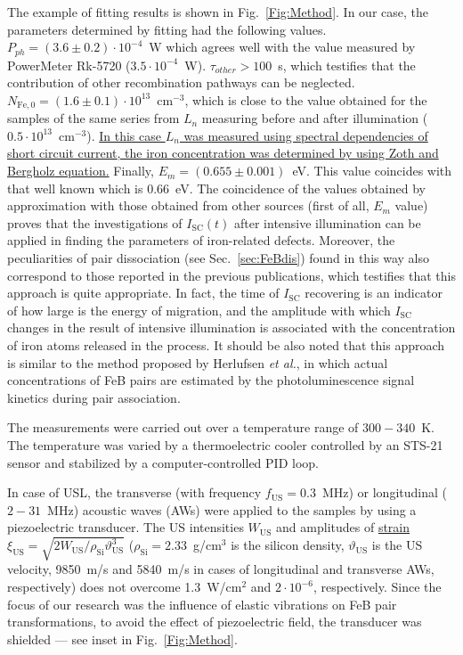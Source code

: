 \documentclass[%
 aip,jap,
 amsmath,amssymb,
 reprint,%
]{revtex4-1}
\begin{document}
The example of fitting results is shown in Fig.~\ref{Fig:Method}.
In our case, the parameters determined by fitting had the following values.
$P_{ph} = (3.6\pm0.2)\cdot10^{-4}$~W which agrees well
with the value measured by PowerMeter Rk-5720 ($3.5\cdot10^{-4}$~W).
$\tau_{other}>100$~s, which testifies that the contribution of other recombination pathways can be neglected.
$N_\mathrm{Fe,0}=(1.6\pm0.1)\cdot10^{13}$~cm$^{-3}$,
which is close to the value obtained for the samples of the same series from $L_n$ measuring before and after illumination ($0.5\cdot10^{13}$~cm$^{-3}$).
\textcolor[rgb]{0.00,0.07,1.00}{\uline{
In this case $L_{n}$ was measured using spectral dependencies of short circuit current\cite{LnIscMethod},
the iron concentration was determined by using Zoth and Bergholz\cite{FeB_Zong} equation.}}
Finally, $E_m = (0.655\pm0.001)$~eV.
This value coincides with that well known \cite{FeBAssJAP2014,FeBkinAPL2008,FeBKin2019,FeBAssSST2011} which is $0.66$~eV.
The coincidence of the values obtained by approximation
with those obtained from other sources (first of all, $E_m$ value) proves
that the investigations of $I_\mathrm{SC}(t)$ after intensive illumination can be applied in finding the parameters of iron-related defects.
Moreover, the peculiarities of pair dissociation (see Sec.~\ref{sec:FeBdis}) found in this way also correspond to those reported in the previous publications, which testifies that this approach is quite appropriate.
In fact, the time of $I_\mathrm{SC}$ recovering is an indicator of how large is the energy of migration,
and the amplitude with which $I_\mathrm{SC}$ changes in the result of intensive illumination is associated with the concentration of iron atoms released in the process.
It should be also noted that this approach is similar to the method proposed
by Herlufsen \emph{et al.}\cite{FeMethod2012}, in which actual concentrations of FeB pairs are estimated by the photoluminescence signal kinetics during pair association.

The measurements were carried out over a temperature range of $300-340$~K.
The temperature was varied by a thermoelectric cooler controlled by an STS-21 sensor and stabilized by a computer-controlled PID loop.

In case of USL, the transverse (with frequency $f_\mathrm{US}=0.3$~MHz) or
longitudinal ($2-31$~MHz) acoustic waves (AWs) were applied to the samples by using a piezoelectric transducer.
The US intensities $W_\mathrm{US}$ and amplitudes of \textcolor[rgb]{0.00,0.07,1.00}{\uline{strain}}
$\xi_\mathrm{US}=\sqrt{2W_\mathrm{US}/\rho_\mathrm{Si}\vartheta_\mathrm{US}^3}$
($\rho_\mathrm{Si}=2.33$~g/cm$^3$ is the silicon density,
$\vartheta_\mathrm{US}$ is the US velocity, 9850~m/s and 5840~m/s in cases of longitudinal and transverse AWs, respectively)
does not overcome 1.3~W/cm$^2$ and $2\cdot10^{-6}$, respectively.
Since the focus of our research was the influence of elastic vibrations on  FeB pair transformations,   to avoid the effect of piezoelectric field, the transducer was shielded --– see inset in Fig.~\ref{Fig:Method}.
\end{document}
